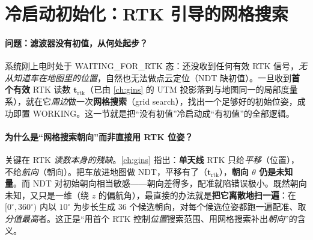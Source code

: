 \section{冷启动初始化：RTK 引导的网格搜索}
\label{sec:lidar-loc-init}

\paragraph{问题：滤波器没有初值，从何处起步？}
系统刚上电时处于 \textsf{WAITING\_FOR\_RTK} 态：还没收到任何有效 RTK 信号，\emph{无从知道车在地图里的位置}，自然也无法做点云定位（NDT 缺初值）。一旦收到\textbf{首个有效} RTK 读数 $\mathbf t_{\mathrm{rtk}}$（已由 \cref{ch:gins} 的 UTM 投影落到与地图同一的局部度量系），就在它\emph{周边}做一次\textbf{网格搜索}（grid search），找出一个足够好的初始位姿，成功即置 \textsf{WORKING}。这一节就是把“没有初值”冷启动成“有初值”的全部逻辑。

\paragraph{为什么是“网格搜索朝向”而非直接用 RTK 位姿？}
关键在 RTK \emph{读数本身的残缺}。\cref{ch:gins} 指出：\textbf{单天线} RTK 只给\emph{平移}（位置），不给\emph{航向}（朝向）。把车放进地图做 NDT，平移有了（$\mathbf t_{\mathrm{rtk}}$），\textbf{朝向 $\theta$ 仍是未知量}。而 NDT 对初始朝向相当敏感——朝向差得多，配准就陷错误极小。既然朝向未知，又只是一维（绕 $z$ 的偏航角），最直接的办法就是\textbf{把它离散地扫一遍}：在 $[0^\circ,360^\circ)$ 内以 $10^\circ$ 为步长生成 $36$ 个候选朝向，对每个候选位姿都跑一遍配准、取\emph{分值最高}者。这正是“用首个 RTK 控制\emph{位置}搜索范围、用网格搜索补出\emph{朝向}”的含义。

